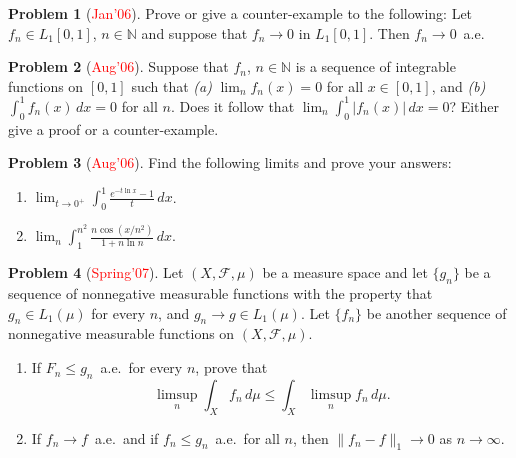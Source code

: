 \documentclass[12pt,reqno]{amsart}
\def\field#1{\mathbb{#1}}
\def\abs#1{\lvert {#1} \rvert}
\def\Lpnorm#1#2{\lVert {#1} \rVert_{#2}}
\def\redc#1{[\textcolor{red}{#1}]}
\theoremstyle{definition}
\newtheorem{problem}{Problem}
\theoremstyle{remark}
\begin{document}
\begin{problem}\redc{Jan'06} \label{L1notae}
  Prove or give a counter-example to the following: Let $f_n \in
  L_1[0,1]$, $n \in \field{N}$ and suppose that $f_n \to 0$ in
  $L_1[0,1]$.  Then $f_n \to 0$~a.e.
\end{problem}
\begin{problem}\redc{Aug'06}
  Suppose that $f_n$, $n \in \field{N}$ is a sequence of integrable
  functions on $[0,1]$ such that \textit{(a)} $\lim_n f_n(x) =0$ for
  all $x \in [0,1]$, and \textit{(b)} $\int_0^1 f_n(x)\, dx = 0$ for
  all $n$.  Does it follow that $\lim_n \int_0^1 \abs{f_n(x)}\, dx
  =0$?  Either give a proof or a counter-example.
\end{problem}
\begin{problem}\redc{Aug'06}
  Find the following limits and prove your answers:
  \begin{enumerate}
  \item $\displaystyle{\lim_{t \to 0^+}} \int_0^1 \frac{e^{-t \ln
        x} - 1}{t}\, dx$.
  \item $\displaystyle{\lim_n \int_1^{n^2} \frac{n \cos (x/n^2)}{1+ n
        \ln n}\, dx}$.
  \end{enumerate}
\end{problem}
\begin{problem}[\textcolor{red}{Spring'07}]
  Let $(X, \mathcal{F}, \mu)$ be a measure space and let $\{ g_n \}$
  be a sequence of nonnegative measurable functions with the property
  that $g_n \in L_1(\mu)$ for every $n$, and $g_n \to g \in
  L_1(\mu)$. Let $\{ f_n\}$ be another sequence of nonnegative
  measurable functions on $(X, \mathcal{F}, \mu)$.
  \begin{enumerate}
  \item If $F_n \leq g_n$~a.e.~for every $n$, prove that
    \begin{equation*}
      \limsup_n \int_X f_n\, d\mu \leq \int_X \limsup_n f_n\, d\mu.
    \end{equation*}
  \item If $f_n \to f$~a.e.~and if $f_n \leq g_n$~a.e.~for all $n$,
  then $\Lpnorm{f_n - f}{1} \to 0$ as $n \to \infty$.
  \end{enumerate}
\end{problem}
\end{document}
